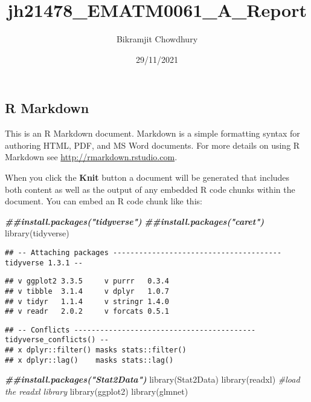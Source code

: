 \documentclass[
]{article}
\title{jh21478\_EMATM0061\_A\_Report}
\author{Bikramjit Chowdhury}
\date{29/11/2021}
\newenvironment{Shaded}{\begin{snugshade}}{\end{snugshade}}
\newcommand{\CommentTok}[1]{\textcolor[rgb]{0.56,0.35,0.01}{\textit{#1}}}
\newcommand{\DocumentationTok}[1]{\textcolor[rgb]{0.56,0.35,0.01}{\textbf{\textit{#1}}}}
\newcommand{\FunctionTok}[1]{\textcolor[rgb]{0.00,0.00,0.00}{#1}}
\newcommand{\NormalTok}[1]{#1}
\begin{document}
\maketitle

\hypertarget{r-markdown}{%
\subsection{R Markdown}\label{r-markdown}}

This is an R Markdown document. Markdown is a simple formatting syntax
for authoring HTML, PDF, and MS Word documents. For more details on
using R Markdown see \url{http://rmarkdown.rstudio.com}.

When you click the \textbf{Knit} button a document will be generated
that includes both content as well as the output of any embedded R code
chunks within the document. You can embed an R code chunk like this:

\begin{Shaded}
\begin{Highlighting}[]
\DocumentationTok{\#\#install.packages("tidyverse")}
\DocumentationTok{\#\#install.packages("caret")}
\FunctionTok{library}\NormalTok{(tidyverse)}
\end{Highlighting}
\end{Shaded}

\begin{verbatim}
## -- Attaching packages --------------------------------------- tidyverse 1.3.1 --
\end{verbatim}

\begin{verbatim}
## v ggplot2 3.3.5     v purrr   0.3.4
## v tibble  3.1.4     v dplyr   1.0.7
## v tidyr   1.1.4     v stringr 1.4.0
## v readr   2.0.2     v forcats 0.5.1
\end{verbatim}

\begin{verbatim}
## -- Conflicts ------------------------------------------ tidyverse_conflicts() --
## x dplyr::filter() masks stats::filter()
## x dplyr::lag()    masks stats::lag()
\end{verbatim}

\begin{Shaded}
\begin{Highlighting}[]
\DocumentationTok{\#\#install.packages("Stat2Data")}
\FunctionTok{library}\NormalTok{(Stat2Data)}
\FunctionTok{library}\NormalTok{(readxl) }\CommentTok{\#load the readxl library}
\FunctionTok{library}\NormalTok{(ggplot2)}
\FunctionTok{library}\NormalTok{(glmnet)}
\end{Highlighting}
\end{Shaded}
\end{document}
